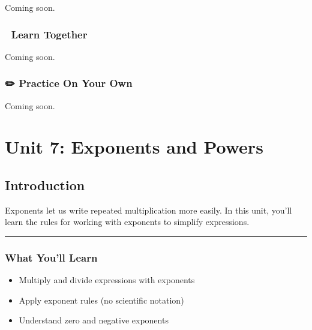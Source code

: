 \documentclass[
  letterpaper,
]{scrrept}
\providecommand{\tightlist}{%
  \setlength{\itemsep}{0pt}\setlength{\parskip}{0pt}}
\begin{document}

Coming soon.

\section*{🧠 Learn Together}\label{learn-together-31}


Coming soon.

\section*{✏️ Practice On Your Own}\label{practice-on-your-own-31}


Coming soon.

\part{Unit 7: Exponents and Powers}

\chapter*{Introduction}\label{introduction-6}


Exponents let us write repeated multiplication more easily. In this
unit, you'll learn the rules for working with exponents to simplify
expressions.

\begin{center}\rule{0.5\linewidth}{0.5pt}\end{center}

\section*{What You'll Learn}\label{what-youll-learn-5}


\begin{itemize}
\tightlist
\item
  Multiply and divide expressions with exponents
\item
  Apply exponent rules (no scientific notation)
\item
  Understand zero and negative exponents
\end{itemize}
\end{document}
